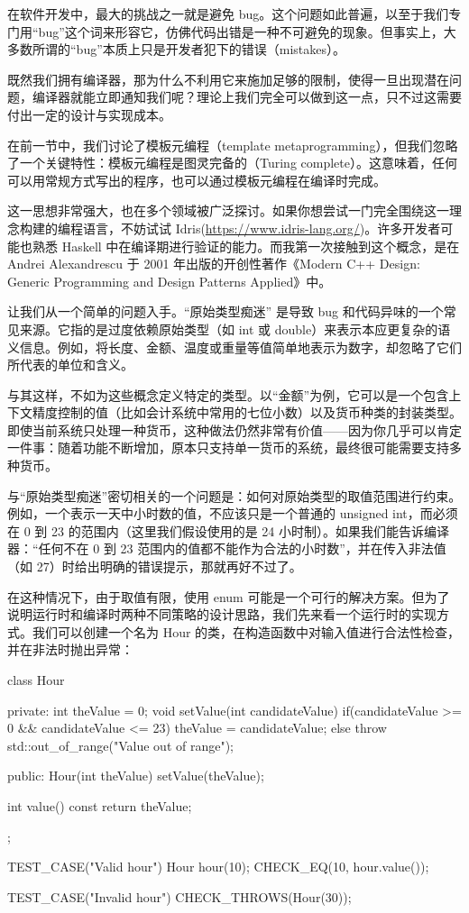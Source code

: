 

在软件开发中，最大的挑战之一就是避免 bug。这个问题如此普遍，以至于我们专门用“bug”这个词来形容它，仿佛代码出错是一种不可避免的现象。但事实上，大多数所谓的“bug”本质上只是开发者犯下的错误（mistakes）。

既然我们拥有编译器，那为什么不利用它来施加足够的限制，使得一旦出现潜在问题，编译器就能立即通知我们呢？理论上我们完全可以做到这一点，只不过这需要付出一定的设计与实现成本。

在前一节中，我们讨论了模板元编程（template metaprogramming），但我们忽略了一个关键特性：模板元编程是图灵完备的（Turing complete）。这意味着，任何可以用常规方式写出的程序，也可以通过模板元编程在编译时完成。

这一思想非常强大，也在多个领域被广泛探讨。如果你想尝试一门完全围绕这一理念构建的编程语言，不妨试试 Idris(\url{https://www.idris-lang.org/})。许多开发者可能也熟悉 Haskell 中在编译期进行验证的能力。而我第一次接触到这个概念，是在 Andrei Alexandrescu 于 2001 年出版的开创性著作《Modern C++ Design: Generic Programming and Design Patterns Applied》中。

让我们从一个简单的问题入手。“原始类型痴迷” 是导致 bug 和代码异味的一个常见来源。它指的是过度依赖原始类型（如 int 或 double）来表示本应更复杂的语义信息。例如，将长度、金额、温度或重量等值简单地表示为数字，却忽略了它们所代表的单位和含义。

与其这样，不如为这些概念定义特定的类型。以“金额”为例，它可以是一个包含上下文精度控制的值（比如会计系统中常用的七位小数）以及货币种类的封装类型。即使当前系统只处理一种货币，这种做法仍然非常有价值——因为你几乎可以肯定一件事：随着功能不断增加，原本只支持单一货币的系统，最终很可能需要支持多种货币。

与“原始类型痴迷”密切相关的一个问题是：如何对原始类型的取值范围进行约束。例如，一个表示一天中小时数的值，不应该只是一个普通的 unsigned int，而必须在 0 到 23 的范围内（这里我们假设使用的是 24 小时制）。如果我们能告诉编译器：“任何不在 0 到 23 范围内的值都不能作为合法的小时数”，并在传入非法值（如 27）时给出明确的错误提示，那就再好不过了。

在这种情况下，由于取值有限，使用 enum 可能是一个可行的解决方案。但为了说明运行时和编译时两种不同策略的设计思路，我们先来看一个运行时的实现方式。我们可以创建一个名为 Hour 的类，在构造函数中对输入值进行合法性检查，并在非法时抛出异常：

\begin{cpp}
class Hour{
private:
  int theValue = 0;
  void setValue(int candidateValue) {
    if(candidateValue >= 0 && candidateValue <= 23){
      theValue = candidateValue;
    }
    else{
      throw std::out_of_range("Value out of range");
    } 
  }

public:
  Hour(int theValue){
    setValue(theValue);
  }

  int value() const {
    return theValue;
  }
};

TEST_CASE("Valid hour"){
  Hour hour(10);
  CHECK_EQ(10, hour.value());
}

TEST_CASE("Invalid hour"){
  CHECK_THROWS(Hour(30));
}
\end{cpp}

